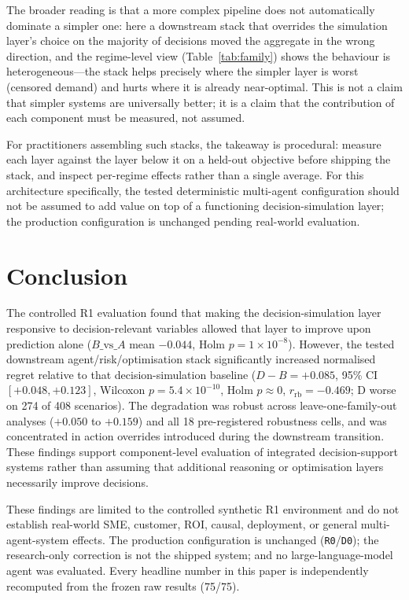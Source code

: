 \documentclass[10pt,twocolumn,a4paper]{article}
\newcommand{\code}[1]{\texttt{#1}}
\newcommand{\dvb}{\ensuremath{D\!-\!B}}
\newcommand{\rb}{\ensuremath{r_{\mathrm{rb}}}}
\begin{document}
The broader reading is that a more complex pipeline does not automatically
dominate a simpler one: here a downstream stack that overrides the
simulation layer's choice on the majority of decisions moved the aggregate in
the wrong direction, and the regime-level view (Table~\ref{tab:family}) shows the
behaviour is heterogeneous---the stack helps precisely where the simpler layer
is worst (censored demand) and hurts where it is already near-optimal. This is
not a claim that simpler systems are universally better; it is a claim that the
contribution of each component must be measured, not assumed.

For practitioners assembling such stacks, the takeaway is procedural: measure
each layer against the layer below it on a held-out objective before shipping
the stack, and inspect per-regime effects rather than a single average. For this
architecture specifically, the tested deterministic multi-agent configuration
should not be assumed to add value on top of a functioning decision-simulation
layer; the production configuration is unchanged pending real-world evaluation.

\section{Conclusion}\label{sec:conc}
The controlled R1 evaluation found that making the decision-simulation layer
responsive to decision-relevant variables allowed that layer to improve upon
prediction alone ($B\text{\_vs\_}A$ mean $-0.044$, Holm $p=1\times10^{-8}$).
However, the tested downstream agent/risk/optimisation stack significantly
increased normalised regret relative to that decision-simulation baseline
($\dvb = +0.085$, 95\% CI $[+0.048,+0.123]$, Wilcoxon $p=5.4\times10^{-10}$,
Holm $p\approx0$, \rb${}=-0.469$; D worse on 274 of 408 scenarios). The
degradation was robust across leave-one-family-out analyses ($+0.050$ to
$+0.159$) and all 18 pre-registered robustness cells, and was concentrated in
action overrides introduced during the downstream transition. These findings
support component-level evaluation of integrated decision-support systems rather
than assuming that additional reasoning or optimisation layers necessarily
improve decisions.

These findings are limited to the controlled synthetic R1 environment and do not
establish real-world SME, customer, ROI, causal, deployment, or general
multi-agent-system effects. The production configuration is unchanged
(\code{R0}/\code{D0}); the research-only correction is not the shipped system;
and no large-language-model agent was evaluated. Every headline number in this
paper is independently recomputed from the frozen raw results (75/75).
\end{document}
